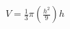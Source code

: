 \documentclass[preview]{standalone}
\begin{document}
\begin{align*}
V = \frac{1}{3}\pi\left(\frac{h^2}{9}\right) h
\end{align*}
\end{document}
